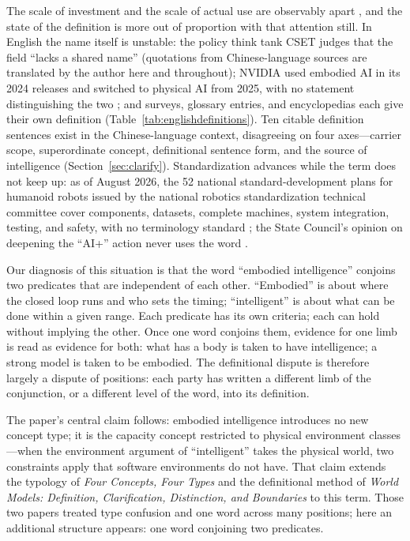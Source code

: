 \documentclass[10pt]{article}
\begin{document}
The scale of investment and the scale of actual use are observably apart \cite{caict2026,idc2026,reuters2026}, and the state of the definition is more out of proportion with that attention still. In English the name itself is unstable: the policy think tank CSET judges that the field ``lacks a shared name'' \cite{cset2026} (quotations from Chinese-language sources are translated by the author here and throughout); NVIDIA used embodied AI in its 2024 releases and switched to physical AI from 2025, with no statement distinguishing the two \cite{nvidia2024,ces2025,nvglossary}; and surveys, glossary entries, and encyclopedias each give their own definition (Table~\ref{tab:englishdefinitions}). Ten citable definition sentences exist in the Chinese-language context, disagreeing on four axes---carrier scope, superordinate concept, definitional sentence form, and the source of intelligence (Section~\ref{sec:clarify}). Standardization advances while the term does not keep up: as of August 2026, the 52 national standard-development plans for humanoid robots issued by the national robotics standardization technical committee cover components, datasets, complete machines, system integration, testing, and safety, with no terminology standard \cite{caict2026}; the State Council's opinion on deepening the ``AI+'' action never uses the word \cite{guofa2025}.

Our diagnosis of this situation is that the word ``embodied intelligence'' conjoins two predicates that are independent of each other. ``Embodied'' is about where the closed loop runs and who sets the timing; ``intelligent'' is about what can be done within a given range. Each predicate has its own criteria; each can hold without implying the other. Once one word conjoins them, evidence for one limb is read as evidence for both: what has a body is taken to have intelligence; a strong model is taken to be embodied. The definitional dispute is therefore largely a dispute of positions: each party has written a different limb of the conjunction, or a different level of the word, into its definition.

The paper's central claim follows: embodied intelligence introduces no new concept type; it is the capacity concept restricted to physical environment classes---when the environment argument of ``intelligent'' takes the physical world, two constraints apply that software environments do not have. That claim extends the typology of \textit{Four Concepts, Four Types} \cite{yu2026four} and the definitional method of \textit{World Models: Definition, Clarification, Distinction, and Boundaries} \cite{yu2026wm} to this term. Those two papers treated type confusion and one word across many positions; here an additional structure appears: one word conjoining two predicates.
\end{document}
